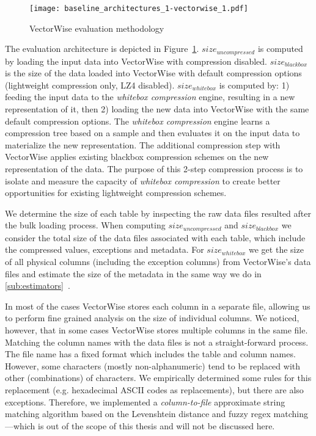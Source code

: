 \begin{figure}[h]
  \centering
  \texttt{[image: baseline\_architectures\_1-vectorwise\_1.pdf]}
  \caption{VectorWise evaluation methodology}
  \label{fig:eval:methodology:vectorwisebaseline}
\end{figure}

The evaluation architecture is depicted in Figure~\ref{fig:eval:methodology:vectorwisebaseline}. \(size_{uncompressed}\) is computed by loading the input data into VectorWise with compression disabled. \(size_{blackbox}\) is the size of the data loaded into VectorWise with default compression options (lightweight compression only, LZ4 disabled). \(size_{whitebox}\) is computed by: 1) feeding the input data to the \textit{whitebox compression} engine, resulting in a new representation of it, then 2) loading the new data into VectorWise with the same default compression options. The \textit{whitebox compression} engine learns a compression tree based on a sample and then evaluates it on the input data to materialize the new representation. The additional compression step with VectorWise applies existing blackbox compression schemes on the new representation of the data. The purpose of this 2-step compression process is to isolate and measure the capacity of \textit{whitebox compression} to create better opportunities for existing lightweight compression schemes.

We determine the size of each table by inspecting the raw data files resulted after the bulk loading process. When computing \(size_{uncompressed}\) and \(size_{blackbox}\) we consider the total size of the data files associated with each table, which include the compressed values, exceptions and metadata. For \(size_{whitebox}\) we get the size of all physical columns (including the exception columns) from VectorWise's data files and estimate the size of the metadata in the same way we do in \ref{sub:estimators}~.

In most of the cases VectorWise stores each column in a separate file, allowing us to perform fine grained analysis on the size of individual columns. We noticed, however, that in some cases VectorWise stores multiple columns in the same file. Matching the column names with the data files is not a straight-forward process. The file name has a fixed format which includes the table and column names. However, some characters (mostly non-alphanumeric) tend to be replaced with other (combinations) of characters. We empirically determined some rules for this replacement (e.g. hexadecimal ASCII codes as replacements), but there are also exceptions. Therefore, we implemented a \textit{column-to-file} approximate string matching algorithm based on the Levenshtein distance \cite{levenshtein1966binary} and fuzzy regex matching \cite{pypiregex}---which is out of the scope of this thesis and will not be discussed here.

